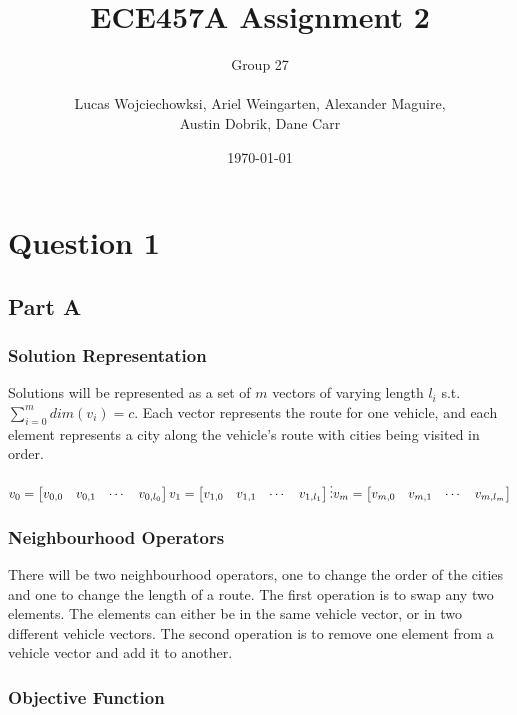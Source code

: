 \documentclass[a4paper]{article}
\title{ECE457A Assignment 2}
\author{
  Group 27 \\
  \\
  Lucas Wojciechowksi, Ariel Weingarten, Alexander Maguire, \\
  Austin Dobrik, Dane Carr}
\date{\today}
\begin{document}
\maketitle

\section{Question 1}

\subsection{Part A}

\subsubsection{Solution Representation}

Solutions will be represented as a set of $m$ vectors of varying length $l_{i}$ s.t. $\sum_{i=0}^{m}dim(v_{i}) = c$. 
Each vector represents the route for one vehicle, and each element represents a city along the vehicle's route with cities being visited in order.

$v_{0} = \begin{bmatrix}
v_{0,0} & v_{0,1} & \cdots & v_{0,l_{0}}
\end{bmatrix} \\
v_{1} = \begin{bmatrix}
v_{1,0} & v_{1,1} & \cdots & v_{1,l_{1}}
\end{bmatrix} \\
\vdots \\
v_{m} = \begin{bmatrix}
v_{m,0} & v_{m,1} & \cdots & v_{m,l_{m}}
\end{bmatrix}$

\subsubsection{Neighbourhood Operators}

There will be two neighbourhood operators, one to change the order of the cities and one to change the length of a route.  The first operation is
to swap any two elements.  The elements can either be in the same vehicle vector, or in two different vehicle vectors.  The second operation is to
remove one element from a vehicle vector and add it to another.

\subsubsection{Objective Function}
\end{document}
